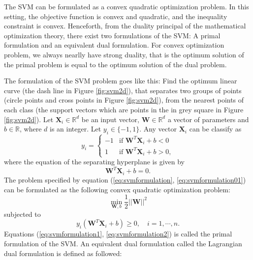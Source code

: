 \documentclass[../Main/thesis.tex]{subfiles}
\begin{document}
\justify
The SVM can be formulated as a convex quadratic optimization problem. In this setting, the objective function is convex and quadratic, and the inequality constraint is convex. Henceforth, from the duality principal of the mathematical optimization theory, there exist two formulations of the SVM: A primal formulation and an equivalent dual formulation. For convex optimization problem, we always nearlly have strong duality, that is the optimum solution of the primal problem is equal to the optimum solution of the dual problem.

\justify
The formulation of the SVM problem goes like this: Find the optimum linear curve (the dash line in Figure \ref{fig:svm2d}), that separates  two groups of points (circle points and cross points in Figure \ref{fig:svm2d}), from the nearest points of each class (the support vectors which are points in the in grey square in Figure \ref{fig:svm2d}).
\justify
Let $\bm{X}_{i} \in \mathbb{R}^{d}$  be an input vector, $\bm{W}\in \mathbb{R}^{d}$ a vector of parameters and $b\in \mathbb{R}$, where $d$ is an integer. Let $y_{i}\in \{-1,1\}$. Any vector $\bm{X}_{i}$ can be classify as 
\begin{equation}\label{eq:svmformulation}
y_{i} =
  \begin{cases}
                                   -1 & \text{if $\bm{W}^{T}\bm{X}_{i} + b < 0$} \\
                                   1 & \text{if $\bm{W}^{T}\bm{X}_{i} + b > 0$},
  \end{cases}
\end{equation}
where the equation of the separating hyperplane is given by 
\begin{equation}\label{eq:svmformulation01}
\bm{W}^{T}\bm{X}_{i} + b = 0.
\end{equation}
The problem specified by equation (\ref{eq:svmformulation}, \ref{eq:svmformulation01}) can be formulated as the following convex quadratic optimization problem:
\begin{equation}\label{eq:svmformulation1}
\min_{\bm{W},b}\frac{1}{2}||  \bm{W}||^{2}
\end{equation}
subjected to 
\begin{equation}\label{eq:svmformulation2}
y_{i}\left( \bm{W}^{T}\bm{X}_{i} + b \right) \geq 0, \quad i = 1,\cdots,n.
\end{equation}
Equations (\ref{eq:svmformulation1}, \ref{eq:svmformulation2}) is called the primal formulation of the SVM. An equivalent dual formulation called the Lagrangian dual formulation is defined as followed:
\end{document}
